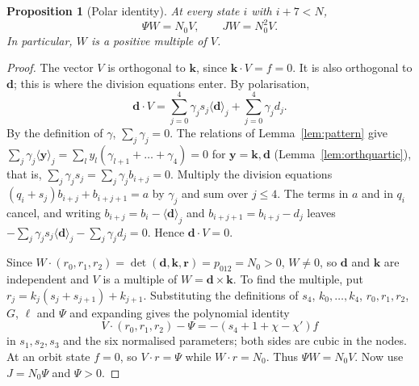 \documentclass[11pt]{article}
\newtheorem{proposition}[theorem]{Proposition}
\theoremstyle{definition}
\theoremstyle{remark}
\begin{document}
\begin{proposition}[Polar identity]\label{prop:polaridentity}
At every state $i$ with $i+7<N$,
\[
 \Psi W=N_0V,\qquad JW=N_0^2V.
\]
In particular, $W$ is a positive multiple of $V$.
\end{proposition}
\begin{proof}
The vector $V$ is orthogonal to $\mathbf k$, since $\mathbf k\cdot V=f=0$. It is
also orthogonal to $\mathbf d$; this is where the division equations enter.
By polarisation,
\[
 \mathbf d\cdot V=\sum_{j=0}^4\gamma_js_j\langle\mathbf d\rangle_j+\sum_{j=0}^4\gamma_jd_j.
\]
By the definition of $\gamma$, $\sum_j\gamma_j=0$. The relations of
Lemma~\ref{lem:pattern} give
$\sum_j\gamma_j\langle\mathbf y\rangle_j=\sum_ly_l(\gamma_{l+1}+\dots+\gamma_4)=0$ for
$\mathbf y=\mathbf k,\mathbf d$ (Lemma~\ref{lem:orthquartic}), that is,
$\sum_j\gamma_js_j=\sum_j\gamma_jb_{i+j}=0$. Multiply the division equations
$(q_i+s_j)b_{i+j}+b_{i+j+1}=a$ by $\gamma_j$ and sum over $j\le4$. The terms in $a$
and in $q_i$ cancel, and writing $b_{i+j}=b_i-\langle\mathbf d\rangle_j$ and
$b_{i+j+1}=b_{i+j}-d_j$ leaves
$-\sum_j\gamma_js_j\langle\mathbf d\rangle_j-\sum_j\gamma_jd_j=0$. Hence $\mathbf d\cdot V=0$.

Since $W\cdot(r_0,r_1,r_2)=\det(\mathbf d,\mathbf k,\mathbf r)=p_{012}=N_0>0$, $W\ne0$, so $\mathbf d$
and $\mathbf k$ are independent and $V$ is a multiple of $W=\mathbf d\times\mathbf k$.
To find the multiple, put $r_j=k_j(s_j+s_{j+1})+k_{j+1}$. Substituting the
definitions of $s_4$, $k_0,\dots,k_4$, $r_0,r_1,r_2$, $G$, $\ell$ and $\Psi$ and
expanding gives the polynomial identity
\[
 V\cdot(r_0,r_1,r_2)-\Psi=-(s_4+1+\chi-\chi')f
\]
in $s_1,s_2,s_3$ and the six normalised parameters; both sides are cubic in the
nodes. At an orbit state $f=0$, so $V\cdot r=\Psi$ while $W\cdot r=N_0$. Thus $\Psi W=N_0V$. Now use $J=N_0\Psi$
and $\Psi>0$.
\end{proof}
\end{document}
